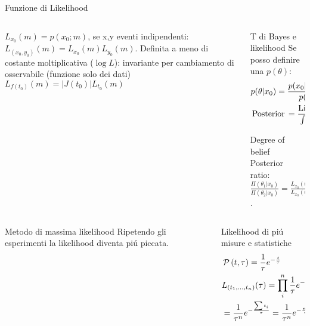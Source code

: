 \begin{frame}{Funzione di Likelihood}
\begin{columns}[T]
\begin{column}{0.5\textwidth}
$L_{x_0}(m)=p(x_0;m)$, se x,y eventi indipendenti: $L_{(x_0,y_0)}(m)=L_{x_0}(m)L_{y_0}(m)$. Definita a meno di costante moltiplicativa ($\log{L}$): invariante per cambiamento di osservabile (funzione solo dei dati)
$L_{f(t_0)}(m)=|J(t_0)|L_{t_0}(m)$
\end{column}
\begin{column}{0.5\textwidth}
\begin{block}{T di Bayes e likelihood}
Se posso definire una $p(\theta)$:
\begin{align*}
&p(\theta|x_0)=\frac{p(x_0|\theta)p(\theta)}{p(x_0)}\\
&\operatorname{Posterior}{}=\frac{\operatorname{Likelihood}{}\operatorname{Prior}{}}{\int p(x_0|\theta)p(\theta)\,d\theta}
\end{align*}
\end{block}
\begin{block}{Degree of belief}
Posterior ratio: $\frac{\Pi(\theta_1|x_0)}{\Pi(\theta_2|x_0)}=\frac{L_{x_0}(\theta_2)}{L_{x_0}(\theta_1)}\frac{\Pi(\theta_2)}{\Pi(\theta_1)}$.
\end{block}
\end{column}
\end{columns} 
\begin{columns}[T]
	\begin{column}{0.5\textwidth}
		\begin{block}{Metodo di massima likelihood}
			Ripetendo gli esperimenti la likelihood diventa pi\'u piccata.
		\end{block}
	\end{column}
	\begin{column}{0.5\textwidth}
		\begin{block}{Likelihood di pi\'u misure e statistiche}
	\begin{align*}
	&\operatorname{\mathcal{P}}{(t,\tau)}=\frac{1}{\tau}e^{-\frac{t}{\tau}}\\
	&L_{(t_1,\ldots,t_n)}(\tau)=\prod_i^n\frac{1}{\tau}e^{-\frac{t_i}{\tau}}\\
	&=\frac{1}{\tau^n}e^{-\frac{\sum t_i}{\tau}}=\frac{1}{\tau^n}e^{-\frac{n\overline{t}}{\tau}}
	\end{align*}
\end{block}
\end{column}
\end{columns}
\end{frame}

